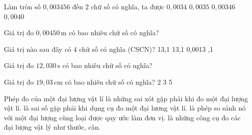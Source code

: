 \begin{ex}
Làm tròn số $0{,}003456$ đến $2$ chữ số có nghĩa, ta được
\choice
{$0{,}0034$}
{\True $0{,}0035$}
{$0{,}00346$}
{$0{,}0040$}
\end{ex}

\begin{ex}
Giá trị đo $0,00450\,\text{m}$ có bao nhiêu chữ số có nghĩa?
\end{ex}

\begin{ex}
Giá trị nào sau đây có 4 chữ số có nghĩa (CSCN)?
\choice
{13,1}
{13,1}
{0,0013}
{,1}
\end{ex}

\begin{ex}
Giá trị đo $12,030\,\text{s}$ có bao nhiêu chữ số có nghĩa?
\end{ex}

\begin{ex}
Giá trị đo $19,03\,\text{cm}$ có bao nhiêu chữ số có nghĩa?
\choice
{2}
{3}
{}
{5}
\end{ex}
\begin{ex}
Phép đo của một đại lượng vật lí
\choice
{là những sai xót gặp phải khi đo một đại lượng vật lí.}
{là sai số gặp phải khi dụng cụ đo một đại lương vật lí.}
{\True là phép so sánh nó với một đại lượng cùng loại được quy ước làm đơn vị.}
{là những công cụ đo các đại lượng vật lý như thước, cân.}
\end{ex}

